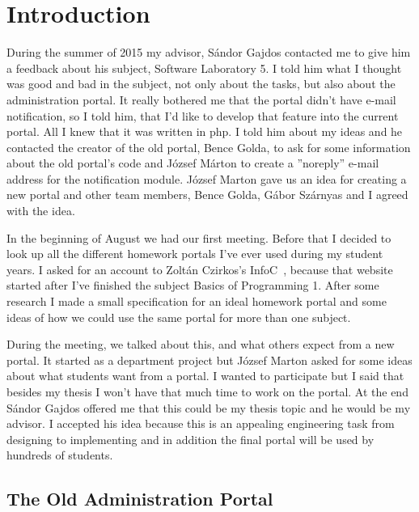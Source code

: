\chapter{Introduction}

During the summer of 2015 my advisor, Sándor Gajdos contacted me to give him a feedback about his subject, Software Laboratory 5. I told him what I thought was good and bad in the subject, not only about the tasks, but also about the administration portal. It really bothered me that the portal didn't have e-mail notification, so I told him, that I'd like to develop that feature into the current portal. All I knew that it was written in php. I told him about my ideas and he contacted the creator of the old portal, Bence Golda, to ask for some information about the old portal's code and József Márton to create a ''noreply'' e-mail address for the notification module. József Marton gave us an idea for creating a new portal and other team members, Bence Golda, Gábor Szárnyas and I agreed with the idea. 

In the beginning of August we had our first meeting. Before that I decided to look up all the different homework portals I've ever used during my student years. I asked for an account to Zoltán Czirkos's InfoC~\cite{InfoC}, because that website started after I've finished the subject Basics of Programming 1. After some research I made a small specification for an ideal homework portal and some ideas of how we could use the same portal for more than one subject.

During the meeting, we talked about this, and what others expect from a new portal. It started as a department project but József Marton asked for some ideas about what students want from a portal. I wanted to participate but I said that besides my thesis I won't have that much time to work on the portal. At the end Sándor Gajdos offered me that this could be my thesis topic and he would be my advisor. I accepted his idea because this is an appealing engineering task from designing to implementing and in addition the final portal will be used by hundreds of students. 


\section{The Old Administration Portal} 

